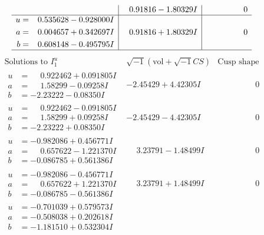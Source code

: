 \documentclass[1p]{elsarticle_modified}
\theoremstyle{definition}
\newcommand{\I}{\sqrt{-1}}
\begin{document}
$$\begin{array}{c|c|c}
 & \phantom{-}0.91816 - 1.80329 I & \phantom{-0.000000 } 0 \\ \hline\begin{aligned}
u &= \phantom{-}0.535628 - 0.928000 I \\
a &= \phantom{-}0.004657 + 0.342697 I \\
b &= \phantom{-}0.608148 - 0.495795 I\end{aligned}
 & \phantom{-}0.91816 + 1.80329 I & \phantom{-0.000000 } 0\\
 \hline 
 \end{array}$$\newpage$$\begin{array}{c|c|c}  
\text{Solutions to }I^u_{1}& \I (\text{vol} + \sqrt{-1}CS) & \text{Cusp shape}\\
 \hline 
\begin{aligned}
u &= \phantom{-}0.922462 + 0.091805 I \\
a &= \phantom{-}1.58299 - 0.09258 I \\
b &= -2.23222 - 0.08350 I\end{aligned}
 & -2.45429 + 4.42305 I & \phantom{-0.000000 } 0 \\ \hline\begin{aligned}
u &= \phantom{-}0.922462 - 0.091805 I \\
a &= \phantom{-}1.58299 + 0.09258 I \\
b &= -2.23222 + 0.08350 I\end{aligned}
 & -2.45429 - 4.42305 I & \phantom{-0.000000 } 0 \\ \hline\begin{aligned}
u &= -0.982086 + 0.456771 I \\
a &= \phantom{-}0.657622 - 1.221370 I \\
b &= -0.086785 + 0.561386 I\end{aligned}
 & \phantom{-}3.23791 - 1.48499 I & \phantom{-0.000000 } 0 \\ \hline\begin{aligned}
u &= -0.982086 - 0.456771 I \\
a &= \phantom{-}0.657622 + 1.221370 I \\
b &= -0.086785 - 0.561386 I\end{aligned}
 & \phantom{-}3.23791 + 1.48499 I & \phantom{-0.000000 } 0 \\ \hline\begin{aligned}
u &= -0.701039 + 0.579573 I \\
a &= -0.508038 + 0.202618 I \\
b &= -1.181510 + 0.532304 I\end{aligned}

\end{array}$$
\end{document}
